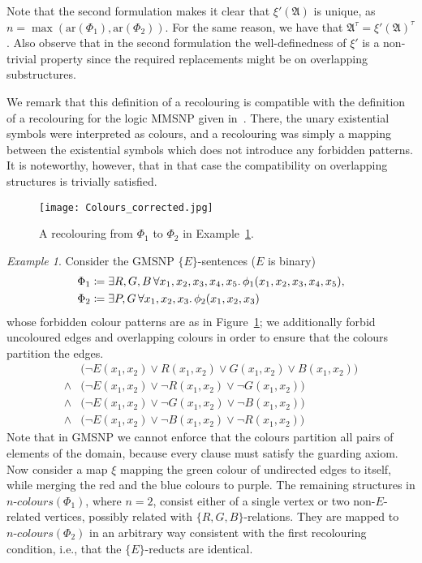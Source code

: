 \documentclass[oneside,reqno,12pt]{amsart}
\theoremstyle{plain}
\theoremstyle{remark}
\newtheorem{example}[thm]{Example}
\renewcommand{\coloneqq}{\mathrel{\mathop:}\mathrel{\mkern-1.2mu}=}
\newcommand{\struct}[1]{\mathfrak{#1}}
\newcommand{\colours}{\ensuremath{n\text{-}\mathit{colours}}}
\newcommand{\ar}{\ensuremath{\mathrm{ar}}\xspace}
\begin{document}
{Note that the second formulation makes it clear that $\xi'(\struct A)$ is unique, as $n = \max(\ar(\Phi_1),\ar(\Phi_2))$.
For the same reason, we have that $\struct{A}^\tau = \xi'(\struct A)^\tau$.  
Also observe that in the second  formulation the well-definedness of $\xi'$ is a non-trivial property since the required replacements might be on overlapping substructures. 

We remark that this definition of a recolouring is compatible with the definition of a recolouring for the logic MMSNP given in~\cite{madelaine2010containment,bodirsky2018_article}.
There, the unary existential symbols were interpreted as colours, and a recolouring was simply a mapping between the existential symbols which does not introduce any forbidden patterns.
It is noteworthy, however, that in that case the compatibility on overlapping structures is trivially satisfied.
 

\begin{figure}[ht]
     \centering
      \texttt{[image: Colours\_corrected.jpg]}
     \caption{A recolouring from $\Phi_1$ to $\Phi_2$ in Example~\ref{ex:recolouring}.}
     \label{fig:colour_patterns}
 \end{figure} 


\begin{example} \label{ex:recolouring}
Consider the GMSNP $\{E\}$-sentences ($E$ is binary) 
\begin{align*} 
\Phi_1\coloneqq \exists & R,G,B\,  \forall x_1,x_2,x_3,x_4,x_5\ldotp \phi_1(x_1,x_2,x_3,x_4,x_5), \\
\Phi_2\coloneqq \exists & P,G\, \forall x_1,x_2,x_3\ldotp \phi_2(x_1,x_2,x_3)     
\end{align*}
whose forbidden colour patterns are as in Figure~\ref{fig:colour_patterns}; we additionally forbid uncoloured edges and overlapping colours in order to ensure that the colours partition the edges.
\begin{align*}
 & \big(\neg E(x_1,x_2) \vee R(x_1,x_2) \vee G(x_1,x_2) \vee B(x_1,x_2) \big)\\  {} \wedge {} &  \big(\neg E(x_1,x_2) \vee \neg R(x_1,x_2) \vee \neg G(x_1,x_2)  \big)  \\
 {}    \wedge {} & \big(\neg E(x_1,x_2) \vee \neg G(x_1,x_2) \vee \neg B(x_1,x_2)  \big)\\
 {} \wedge {} &\big(\neg E(x_1,x_2) \vee \neg B(x_1,x_2) \vee \neg R(x_1,x_2)  \big)   
\end{align*}
Note that in GMSNP we cannot enforce that the colours partition all pairs of elements of the domain, because every clause must satisfy the guarding axiom. 
Now consider a map $\xi$ mapping the green colour of undirected edges to itself, while merging the red and the blue colours to purple.
The remaining structures in $\colours(\Phi_1)$, where $n=2$, consist either of a single vertex or two non-$E$-related vertices, possibly related with $\{R,G,B\}$-relations. 
They are mapped to $\colours(\Phi_2)$ in an arbitrary way consistent with the first recolouring condition, i.e., that the $\{E\}$-reducts are identical.





\end{example}}
\end{document}
